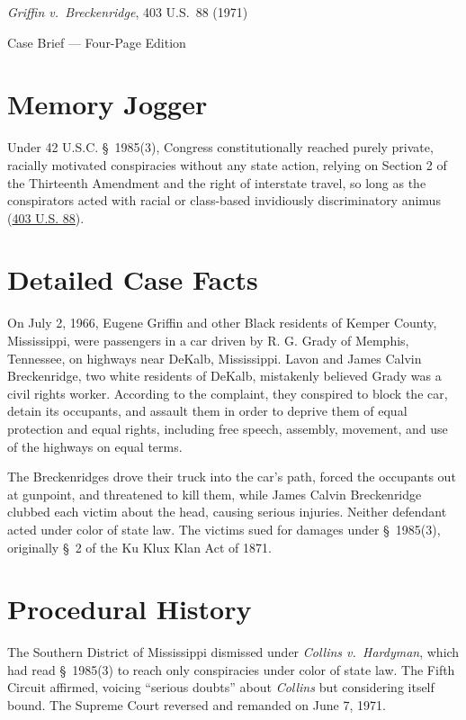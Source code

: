 \documentclass[12pt]{article}
\begin{document}
\begin{center}
{\LARGE \textit{Griffin v.\ Breckenridge}, 403 U.S.\ 88 (1971)\par}
\vspace{0.8em}
{\large Case Brief --- Four-Page Edition\par}
\end{center}
\vspace{1em}

\section{Memory Jogger}

Under 42 U.S.C. \S~1985(3), Congress constitutionally reached purely private, racially motivated conspiracies without any state action, relying on Section 2 of the Thirteenth Amendment and the right of interstate travel, so long as the conspirators acted with racial or class-based invidiously discriminatory animus (\href{https://supreme.justia.com/cases/federal/us/403/88/}{403 U.S. 88}).

\section{Detailed Case Facts}

On July 2, 1966, Eugene Griffin and other Black residents of Kemper County, Mississippi, were passengers in a car driven by R. G. Grady of Memphis, Tennessee, on highways near DeKalb, Mississippi. Lavon and James Calvin Breckenridge, two white residents of DeKalb, mistakenly believed Grady was a civil rights worker. According to the complaint, they conspired to block the car, detain its occupants, and assault them in order to deprive them of equal protection and equal rights, including free speech, assembly, movement, and use of the highways on equal terms.

The Breckenridges drove their truck into the car's path, forced the occupants out at gunpoint, and threatened to kill them, while James Calvin Breckenridge clubbed each victim about the head, causing serious injuries. Neither defendant acted under color of state law. The victims sued for damages under \S~1985(3), originally \S~2 of the Ku Klux Klan Act of 1871.

\section{Procedural History}

The Southern District of Mississippi dismissed under \textit{Collins v.\ Hardyman}, which had read \S~1985(3) to reach only conspiracies under color of state law. The Fifth Circuit affirmed, voicing ``serious doubts'' about \textit{Collins} but considering itself bound. The Supreme Court reversed and remanded on June 7, 1971.
\end{document}
